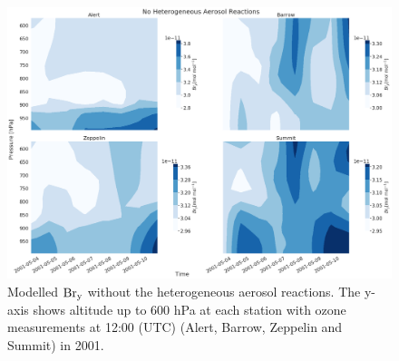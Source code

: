 \begin{figure}
    \centering
    \includegraphics[width = \linewidth]{Chapter6_Results/images/noAerosol_2001_bry.png}
    \caption{Modelled $\mathrm{Br_y}$ without the heterogeneous aerosol reactions. The y-axis shows altitude up to 600 hPa at each station with ozone measurements at 12:00 (UTC) (Alert, Barrow, Zeppelin and Summit) in 2001.}
    \label{fig:vert_noAer_bry_2001}
\end{figure}
